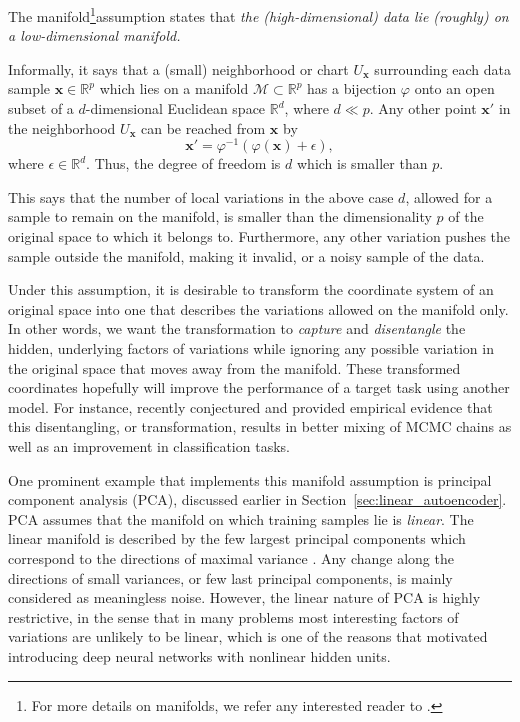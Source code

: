 \documentclass{now}
\newcommand{\vect}[1]{\mathbf{#1}}
\newcommand{\vx}[0]{\vect{x}}
\newcommand{\RR}[0]{\mathbb{R}}
\newcommand{\MM}[0]{\mathcal{M}}
\begin{document}
The manifold\footnote{ For more details on manifolds, we refer any
interested reader to \citep{Absil2008}.}assumption \citep{Chapelle2006} states
that
\textit{
the (high-dimensional) data lie (roughly) on a
low-dimensional manifold.
}

Informally, it says that a (small) neighborhood or chart
$U_\vx$ surrounding each data sample $\vx \in \RR^p$ which
lies on a manifold $\MM \subset \RR^p$ has a bijection
$\varphi$ onto an open subset of a $d$-dimensional Euclidean
space $\RR^d$, where $d \ll p$.
Any other point $\vx'$ in the neighborhood $U_\vx$ can be
reached from $\vx$ by 
\[
\vx' = \varphi^{-1} \left( \varphi(\vx) + \epsilon \right),
\]
where $\epsilon \in \RR^d$. Thus, the degree of freedom is
$d$ which is smaller than $p$.

This says that the number of local variations in the above case
$d$, allowed for a sample to remain on the manifold, is smaller
than the dimensionality $p$ of the original space to which it
belongs to. Furthermore, any other variation pushes the sample
outside the manifold, making it invalid, or a noisy sample of the
data.

Under this assumption, it is desirable to transform the
coordinate system of an original space into one that
describes the variations allowed on the manifold only. In
other words, we want the transformation to \textit{capture}
and \textit{disentangle} the hidden, underlying factors of
variations \citep{Bengio2009a} while ignoring any possible
variation in the original space that moves away from the
manifold. These transformed coordinates hopefully will
improve the performance of a target task using another
model. For instance, \citet{Bengio2013} recently
conjectured and provided empirical evidence that this
disentangling, or transformation, results in better mixing
of MCMC chains as well as an improvement in classification
tasks.

One prominent example that implements this
manifold assumption is principal component analysis
(PCA), discussed earlier in
Section~\ref{sec:linear_autoencoder}. PCA assumes that
the manifold on which training samples lie is
\textit{linear}. The linear manifold is described by the few
largest principal components which correspond to the
directions of maximal variance \citep[see,
e.g.,][]{Bishop2006}. Any change along the directions of small variances, or
few last principal components, is mainly considered as
meaningless
noise. However, the linear nature of PCA is highly
restrictive, in the sense that in many problems most interesting factors of
variations are unlikely to be linear, which is one of the
reasons that motivated introducing deep neural networks with
nonlinear hidden units.
\end{document}
